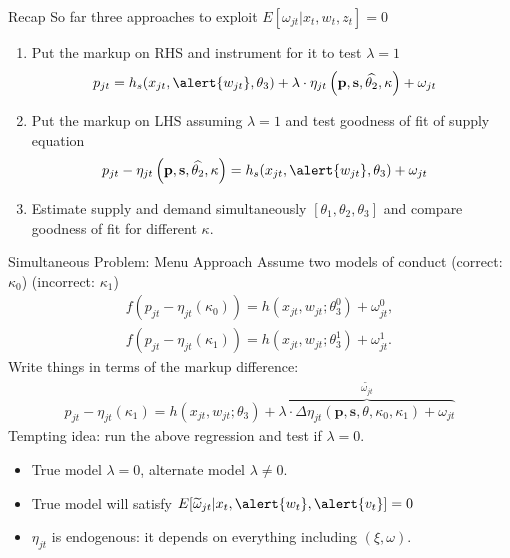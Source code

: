 \documentclass[xcolor=pdftex,dvipsnames,table,mathserif,aspectratio=169]{beamer}
\begin{document}
\begin{frame}{Recap}
\small
So far three approaches to exploit $ E[\omega_{jt} | x_{t},w_{t},z_{t}]=0$
\begin{enumerate}
\item Put the markup on RHS and instrument for it to test $\lambda=1$
\begin{align*}
 p_{jt} &= h_s(x_{jt}, \alert{w_{jt}},\theta_3) + \lambda \cdot \eta_{jt}\left(\mathbf{p},\mathbf{s},\widehat{\theta_2},\kappa \right)+  \omega_{jt}
\end{align*}
\item Put the markup on LHS assuming $\lambda=1$ and test goodness of fit of supply equation
\begin{align*}
 p_{jt} -\eta_{jt}\left(\mathbf{p},\mathbf{s},\widehat{\theta_2},\kappa \right)&= h_s(x_{jt}, \alert{w_{jt}},\theta_3) +  \omega_{jt}
\end{align*}
\item Estimate supply and demand simultaneously $[\theta_1,\theta_2,\theta_3]$ and compare goodness of fit for different $\kappa$.
\end{enumerate}

\end{frame}

\begin{frame}{Simultaneous Problem: Menu Approach}
Assume two models of conduct (correct: $\kappa_0$) (incorrect: $\kappa_1$)
\begin{align*}
f(p_{jt} -\eta_{jt}(\kappa_0))= h(x_{jt},w_{jt};\theta_3^0)+\omega_{jt}^{0},\\
f(p_{jt} -\eta_{jt}(\kappa_1))= h(x_{jt},w_{jt};\theta_3^1)+\omega_{jt}^{1}.
\end{align*}
Write things in terms of the markup difference:
\begin{align*}
p_{jt} -\eta_{jt}(\kappa_1)= h(x_{jt},w_{jt};\theta_3)+ \overbrace{\lambda \cdot  \Delta \eta_{jt}(\mathbf{p},\mathbf{s},\theta,\kappa_0,\kappa_1) +   \omega_{jt}}^{\widetilde{\omega_{jt}}}
\end{align*}
Tempting idea: run the above regression and test if $\lambda=0$.
\begin{itemize}
\item True model $\lambda=0$, alternate model $\lambda \neq 0$.
\item True model will satisfy $E[\widetilde{\omega}_{jt} | x_{t}, \alert{w_{t}}, \alert{v_{t}}]=0$
\item $\eta_{jt}$ is \alert{endogenous}: it depends on everything including $(\xi,\omega)$.
\end{itemize}
\end{frame}
\end{document}
